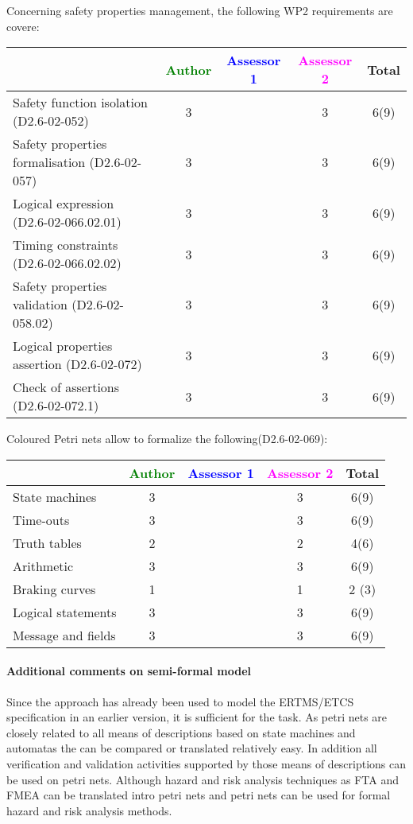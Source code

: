 Concerning safety properties management, the following WP2 requirements are covere:

\begin{tabular}{|l | c | c | c | c|}
\hline
& \textcolor{green}{Author} & \textcolor{blue}{Assessor 1} & \textcolor{magenta}{Assessor 2} & Total \\
\hline 
Safety function isolation (D2.6-02-052)  & 3     & & 3     &  6(9) \\
\hline 
Safety properties formalisation (D2.6-02-057)  & 3     & & 3     &  6(9) \\
\hline
Logical expression (D2.6-02-066.02.01)  & 3     & & 3     &  6(9) \\
\hline
Timing constraints (D2.6-02-066.02.02)  & 3     & & 3     &  6(9) \\
\hline
Safety properties validation (D2.6-02-058.02)  & 3     & & 3     &  6(9) \\
\hline
Logical properties assertion (D2.6-02-072)  & 3     & & 3     &  6(9) \\
\hline
Check  of assertions (D2.6-02-072.1)  & 3     & & 3     &  6(9) \\
\hline
\end{tabular}

Coloured Petri nets allow to  formalize the following(D2.6-02-069):

\begin{tabular}{|l | c | c | c | c|}
\hline
& \textcolor{green}{Author} & \textcolor{blue}{Assessor 1} & \textcolor{magenta}{Assessor 2} & Total \\
\hline 
State machines  & 3     & & 3     &  6(9) \\
\hline
Time-outs  & 3     & & 3     &  6(9) \\
\hline
Truth tables  & 2     & & 2     &  4(6) \\
\hline
Arithmetic  & 3     & & 3     &  6(9) \\
\hline
Braking curves  & 1     & & 1     & 2 (3) \\
\hline
Logical statements & 3     & & 3     &  6(9) \\
\hline
Message and fields & 3     & & 3     &  6(9) \\
\hline
\end{tabular}

\paragraph{Additional comments on semi-formal  model} 
Since the approach has already been used to model the ERTMS/ETCS specification in an earlier version, it is sufficient for the task.
As petri nets are closely related to all means of descriptions based on state machines and automatas the can be compared or translated relatively easy. In addition all verification and validation activities supported by those means of descriptions can be used on petri nets. Although hazard and risk analysis techniques as FTA and FMEA can be translated intro petri nets and petri nets can be used for formal hazard and risk analysis methods.


